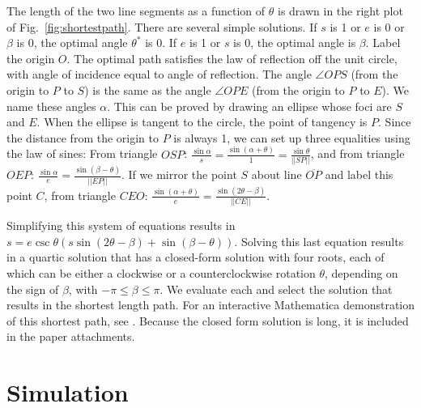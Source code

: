  
 The length of the two line segments as a function of $\theta$ is drawn in the right plot of Fig.~\ref{fig:shortestpath}. There are several simple solutions. If $s$ is 1 or $e$ is 0 or $\beta$ is 0, the optimal angle $\theta^*$ is 0. If $e$ is 1 or $s$ is 0, the optimal angle is $\beta$. Label the origin $O$. 
 The optimal path satisfies the law of reflection off the unit circle, with angle of incidence equal to angle of reflection.
 The angle $\angle{OPS}$ (from the origin to $P$ to $S$) is the same as the angle $\angle{OPE}$ (from the origin to $P$ to $E$). 
 We name these angles $\alpha$. This can be proved by drawing an ellipse whose foci are $S$ and $E$. When the ellipse is tangent to the circle, the point of tangency is $P$. 
  Since the distance from the origin to $P$ is always 1, we can set up three equalities using the law of sines:
 From triangle $OSP$: $\frac{\sin \alpha}{s}=\frac{\sin(\alpha + \theta)}{1}=\frac{\sin \theta}{||SP||}$, and from triangle $OEP$: $\frac{\sin \alpha}{e}=\frac{\sin(\beta - \theta)}{||EP||}$. If we mirror the point $S$ about line $\overline{OP}$ and label this point $C$, from triangle $CEO$: $\frac{\sin(\alpha + \theta)}{e}=\frac{\sin(2 \theta - \beta)}{||CE||}$.
 
 Simplifying this system of equations results in $s=e \csc \theta (s \sin(2 \theta-\beta)+\sin(\beta-\theta))$. Solving this last equation results in a quartic solution that has a closed-form solution with four roots, each of which can be either a clockwise or a counterclockwise rotation $\theta$, depending on the sign of $\beta$, with $-\pi\leq\beta\leq\pi$. We evaluate each and select the solution that results in the shortest length path. %
 For an interactive Mathematica demonstration of this shortest path, see \cite{BeckerShortestPath}. Because the closed form solution is long, it is included in the paper attachments.
 
 



\section{Simulation}\label{sec:simulation}


